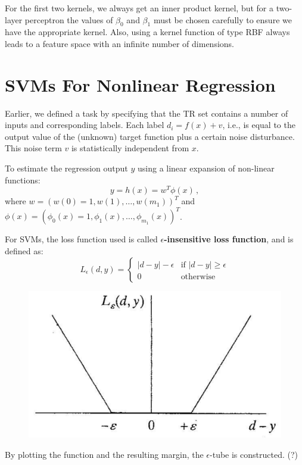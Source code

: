 For the first two kernels, we always get an inner product kernel, but for a two-layer perceptron the values of $\beta_0$ and $\beta_1$ must be chosen carefully to ensure we have the appropriate kernel. Also, using a kernel function of type RBF always leads to a feature space with an infinite number of dimensions.

\section{SVMs For Nonlinear Regression}

Earlier, we defined a task by specifying that the TR set contains a number of inputs and corresponding labels. Each label $d_i = f(x) + v$, i.e., is equal to the output value of the (unknown) target function plus a certain noise disturbance. This noise term $v$ is statistically independent from $x$.

To estimate the regression output $y$ using a linear expansion of non-linear functions:
\begin{equation*}
    y = h(x) = w^T\phi(x) \,,
\end{equation*}
where $w = (w(0)=1, w(1), \dots , w(m_1))^T$ and $\phi(x) = (\phi_0(x)=1, \phi_1(x), \dots , \phi_{m_1}(x))^T$.

For SVMs, the loss function used is called \textbf{$\epsilon$-insensitive loss function}, and is defined as:
\begin{equation*}
    L_{\epsilon}(d,y) = \begin{cases}
                        |d-y| - \epsilon & \text{if } |d-y| \geq \epsilon \\
                        0 & \text{otherwise}
                        \end{cases}
\end{equation*}

\begin{figure}[h]
    \centering
    \includegraphics[width=0.5\linewidth]{img/epsiloninsensitive.png}
\end{figure}
By plotting the function and the resulting margin, the $\epsilon$-tube is constructed. (?)

